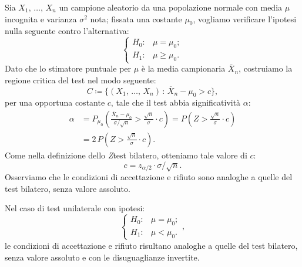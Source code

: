             \begin{defn}[Unilaterale]
                Sia $X_1,\, \ldots,\, X_{n}$ un campione aleatorio da una popolazione normale con media $\mu$ 
                incognita e varianza $\sigma^2$ nota; fissata una costante $\mu_0$, vogliamo verificare 
                l’ipotesi nulla seguente contro l’alternativa: \[
                \begin{cases}
                    H_0 : & \mu = \mu_0; \\
                    H_1 : & \mu \geq \mu_0.
                \end{cases}
                \] Dato che lo stimatore puntuale per $\mu$ è la media campionaria $\overline{X}_n$, costruiamo 
                la regione critica del test nel modo seguente: \[
                    C \coloneqq \big\{(X_1,\, \ldots,\, X_{n}) \,:\, \overline{X}_n -\mu_0 > c\big\}
                ,\] per una opportuna costante $c$, tale che il test abbia significatività $\alpha$:
                \begin{align*}
                    \alpha &= P_{\mu_0}\left(\frac{\overline{X}_n -\mu_0}{\sigma /\sqrt{n}} 
                    > \frac{\sqrt{n}}{\sigma}\cdot c\right)
                    = P\left(Z > \frac{\sqrt{n}}{\sigma}\cdot c\right) \\
                    &= 2\,P\left(Z > \frac{\sqrt{n}}{\sigma}\cdot c\right)
                .\end{align*}
                Come nella definizione dello \emph{Z}\nbdash test bilatero, otteniamo tale valore di $c$: \[
                    c = z_{\alpha /2} \cdot\sigma /\sqrt{n}
                .\] Osserviamo che le condizioni di accettazione e rifiuto sono analoghe a quelle del test 
                bilatero, senza valore assoluto.
            \end{defn}
            \begin{obsv}
                Nel caso di test unilaterale con ipotesi: \[
                    \begin{cases}
                        H_0 : & \mu = \mu_0; \\
                        H_1 : & \mu < \mu_0.
                    \end{cases}
                ,\] le condizioni di accettazione e rifiuto risultano analoghe a quelle del test bilatero, senza 
                valore assoluto e con le disuguaglianze invertite.
            \end{obsv}
